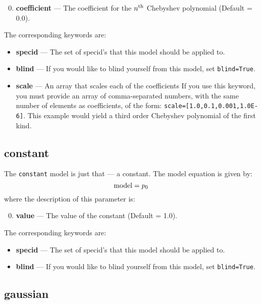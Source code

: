 \begin{enumerate}
\setcounter{enumi}{-1}
\item \textbf{coefficient} --- The coefficient for the $n^{\rm th}$ Chebyshev polynomial (Default = 0.0).
\end{enumerate}

The corresponding keywords are:

\begin{itemize}
\item \textbf{specid} --- The set of specid's that this model should be applied to.
\item \textbf{blind} --- If you would like to blind yourself from this model, set \texttt{blind=True}.
\item \textbf{scale} --- An array that scales each of the coefficients If you use this keyword, you
must provide an array  of comma-separated numbers, with the same number of elements as
coefficients, of the form: \texttt{scale=[1.0,0.1,0.001,1.0E-6]}. This example would yield a third
order Chebyshev polynomial of the first kind.
\end{itemize}


\subsection{constant}

The \texttt{constant} model is just that --- a constant. The model equation is given by:
\begin{equation}
{\rm model}=p_0
\end{equation}
where the description of this parameter is:
\begin{enumerate}
\setcounter{enumi}{-1}
\item \textbf{value} --- The value of the constant (Default = 1.0).
\end{enumerate}
The corresponding keywords are:
\begin{itemize}
\item \textbf{specid} --- The set of specid's that this model should be applied to.
\item \textbf{blind} --- If you would like to blind yourself from this model, set \texttt{blind=True}.
\end{itemize}


\subsection{gaussian}

